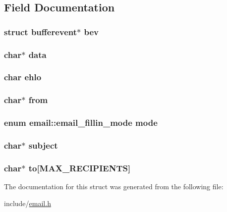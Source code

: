 \subsection{Field Documentation}
\hypertarget{structemail_a7a6bf7d3dd8ad7622482a90042e470ef}{
\subsubsection[{bev}]{\setlength{\rightskip}{0pt plus 5cm}struct bufferevent$\ast$ bev}}\label{structemail_a7a6bf7d3dd8ad7622482a90042e470ef}
\hypertarget{structemail_a91a70b77df95bd8b0830b49a094c2acb}{
\subsubsection[{data}]{\setlength{\rightskip}{0pt plus 5cm}char$\ast$ data}}\label{structemail_a91a70b77df95bd8b0830b49a094c2acb}
\hypertarget{structemail_ab6507ffd67fc6059c2aa721b7b8f8f03}{
\subsubsection[{ehlo}]{\setlength{\rightskip}{0pt plus 5cm}char ehlo}}\label{structemail_ab6507ffd67fc6059c2aa721b7b8f8f03}
\hypertarget{structemail_a765533dfc643627999c751f7e1514664}{
\subsubsection[{from}]{\setlength{\rightskip}{0pt plus 5cm}char$\ast$ from}}\label{structemail_a765533dfc643627999c751f7e1514664}
\hypertarget{structemail_aa0332a154778fc4836577a47d37674ae}{
\subsubsection[{mode}]{\setlength{\rightskip}{0pt plus 5cm}enum {\bf email\-::email\-\_\-fillin\-\_\-mode}  mode}}\label{structemail_aa0332a154778fc4836577a47d37674ae}
\hypertarget{structemail_ae31ac864419a577c2982907c23b426d3}{
\subsubsection[{subject}]{\setlength{\rightskip}{0pt plus 5cm}char$\ast$ subject}}\label{structemail_ae31ac864419a577c2982907c23b426d3}
\hypertarget{structemail_a501cf38e14279529940ea1df44ca4535}{
\subsubsection[{to}]{\setlength{\rightskip}{0pt plus 5cm}char$\ast$ to\mbox{[}{\bf M\-A\-X\-\_\-\-R\-E\-C\-I\-P\-I\-E\-N\-T\-S}\mbox{]}}}\label{structemail_a501cf38e14279529940ea1df44ca4535}


The documentation for this struct was generated from the following file\-:\begin{DoxyCompactItemize}
\item 
include/\hyperlink{email_8h}{email.\-h}\end{DoxyCompactItemize}
